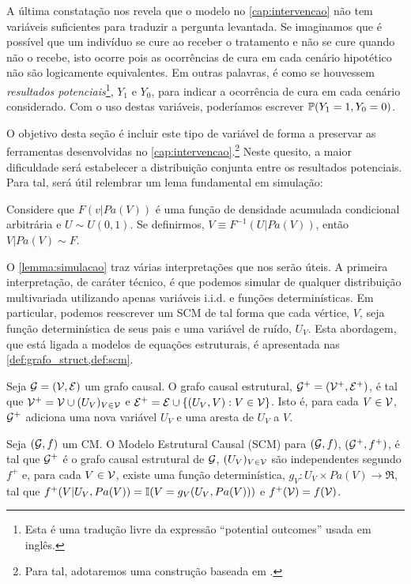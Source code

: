 A última constatação nos revela que
o modelo no \cref{cap:intervencao}
não tem variáveis suficientes para
traduzir a pergunta levantada.
Se imaginamos que é possível que
um indivíduo se cure ao receber o tratamento e
não se cure quando não o recebe, 
isto ocorre pois as ocorrências de cura
em cada cenário hipotético não são 
logicamente equivalentes.
Em outras palavras, é como se 
houvessem \textit{resultados potenciais}\footnote{
 Esta é uma tradução livre da expressão
 ``potential outcomes'' usada em inglês.},
$Y_1$ e $Y_0$, para
indicar a ocorrência de cura em
cada cenário considerado.
Com o uso destas variáveis, 
poderíamos escrever 
$\P(Y_1 = 1, Y_0 = 0)$.

O objetivo desta seção é 
incluir este tipo de variável de forma
a preservar as ferramentas desenvolvidas
no \cref{cap:intervencao}.\footnote{
 Para tal, adotaremos uma construção
 baseada em \citet{Galles1998}.
}
Neste quesito, a maior dificuldade será
estabelecer a distribuição conjunta
entre os resultados potenciais.
Para tal, será útil relembrar
um lema fundamental em simulação:

\begin{lemma}
 \label{lemma:simulacao}
 Considere que $F(v|Pa(V))$ é
 uma função de densidade acumulada condicional arbitrária e
 $U \sim U(0,1)$. Se definirmos,
 $V \equiv F^{-1}(U|Pa(V))$, então
 $V|Pa(V) \sim F$.
\end{lemma}

O \cref{lemma:simulacao} traz 
várias interpretações que nos serão úteis.
A primeira interpretação, de caráter técnico, é 
que podemos simular de 
qualquer distribuição multivariada utilizando apenas
variáveis i.i.d. e funções determinísticas.
Em particular, podemos 
reescrever um SCM de tal forma que
cada vértice, $V$, seja função determinística
de seus pais e uma variável de ruído, $U_V$.
Esta abordagem, que está ligada a
modelos de equações estruturais, é
apresentada nas \cref{def:grafo_struct,def:scm}.

\begin{definition}
 \label{def:grafo_struct}
 Seja $\sG = (\sV, \sE)$ um grafo causal.
 O grafo causal estrutural,
 $\sG^+ = (\sV^+, \sE^+)$, é tal que 
 $\sV^+ = \sV \cup (U_V)_{V \in \sV}$ e
 $\sE^+ = \sE \cup \{(U_V, V): V \in \sV\}$.
 Isto é, para cada $V \in \sV$, 
 $\sG^+$ adiciona uma nova variável $U_V$ e
 uma aresta de $U_V$ a $V$.
\end{definition} 
 
\begin{definition}
 \label{def:scm}
 Seja $(\sG,f)$ um CM.
 O Modelo Estrutural Causal (SCM) para $(\sG,f)$, 
 $(\sG^+,f^+)$, é tal que
 $\sG^+$ é o grafo causal estrutural de $\sG$,
 $(U_V)_{V \in \sV}$ são independentes segundo $f^+$ e,
 para cada $V \in \sV$, existe uma função determinística, 
 $g_V: U_V \times Pa(V) \rightarrow \Re$,
 tal que $f^+(V|U_V,Pa(V)) = \I(V = g_V(U_V, Pa(V)))$ e
 $f^+(\sV) = f(\sV)$.
\end{definition}
 

